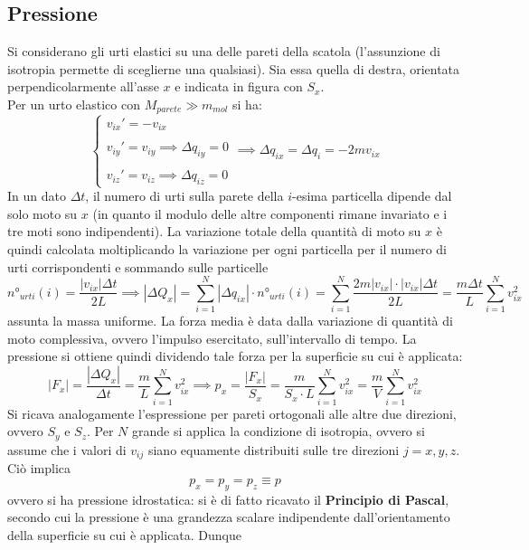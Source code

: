 \documentclass[10pt, oneside]{book}
\begin{document}
\subsection{Pressione}
Si considerano gli urti elastici su una delle pareti della scatola (l'assunzione di isotropia permette di sceglierne una qualsiasi). Sia essa quella di destra, orientata perpendicolarmente all'asse $x$ e indicata in figura con $S_x$.
\\Per un urto elastico con $M_{parete} \gg m_{mol}$ si ha:
\[\begin{cases} \displaystyle v_{ix}' = - v_{ix} \\ \\ \displaystyle v_{iy}' = v_{iy} \implies \Delta q_{iy} = 0\\ \\ \displaystyle v_{iz}' = v_{iz} \implies \Delta q_{iz} = 0
\end{cases} \implies \Delta q_{ix} = \Delta q_i = - 2m v_{ix}\]
In un dato $\Delta t$, il numero di urti sulla parete della $i$-esima particella dipende dal solo moto su $x$ (in quanto il modulo delle altre componenti rimane invariato e i tre moti sono indipendenti). La variazione totale della quantità di moto su $x$ è quindi calcolata moltiplicando la variazione per ogni particella per il numero di urti corrispondenti e sommando sulle particelle
\[n°_{urti}(i) = \frac{|v_{ix}| \Delta t}{2L} \implies |\Delta Q_x| = \sum\limits_{i=1}^N |\Delta q_{ix}| \cdot n°_{urti}(i) = \sum\limits_{i=1}^N \frac{2 m |v_{ix}| \cdot |v_{ix}| \Delta t}{2L} = \frac{m \Delta t}{L} \sum\limits_{i=1}^N v_{ix}^2\]
assunta la massa uniforme. La forza media è data dalla variazione di quantità di moto complessiva, ovvero l'impulso esercitato, sull'intervallo di tempo. La pressione si ottiene quindi dividendo tale forza per la superficie su cui è applicata:
\[|F_x| = \frac{|\Delta Q_x|}{\Delta t} = \frac{m}{L} \sum\limits_{i=1}^N v_{ix}^2 \implies p_x = \frac{|F_x|}{S_x} = \frac{m}{S_x \cdot L} \sum\limits_{i=1}^N v_{ix}^2 = \frac{m}{V} \sum\limits_{i=1}^N v_{ix}^2\]
Si ricava analogamente l'espressione per pareti ortogonali alle altre due direzioni, ovvero $S_y$ e $S_z$. Per $N$ grande si applica la condizione di isotropia, ovvero si assume che i valori di $v_{ij}$ siano equamente distribuiti sulle tre direzioni $j = x, y, z$. Ciò implica
\[p_x = p_y = p_z \equiv p\]
ovvero si ha pressione idrostatica: si è di fatto ricavato il \textbf{Principio di Pascal}, secondo cui la pressione è una grandezza scalare indipendente dall'orientamento della superficie su cui è applicata. Dunque
\end{document}
